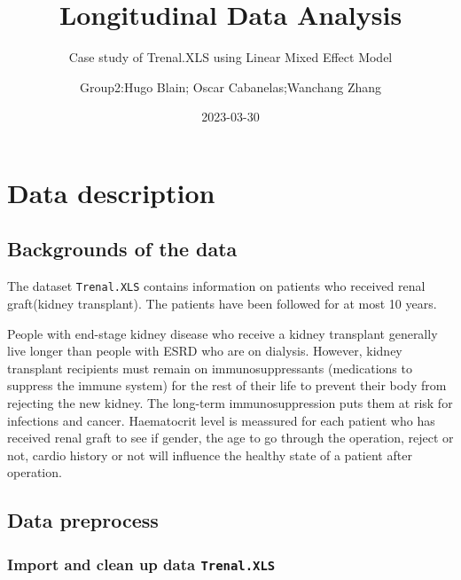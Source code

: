 \documentclass[
]{article}
\title{Longitudinal Data Analysis}
\subtitle{Case study of Trenal.XLS using Linear Mixed Effect Model}
\author{Group2:Hugo Blain; Oscar Cabanelas;Wanchang Zhang}
\date{2023-03-30}
\begin{document}
\maketitle

\newpage 
\tableofcontents 
\listoffigures
\listoftables
\newpage

\hypertarget{data-description}{%
\section{Data description}\label{data-description}}

\hypertarget{backgrounds-of-the-data}{%
\subsection{Backgrounds of the data}\label{backgrounds-of-the-data}}

The dataset \texttt{Trenal.XLS} contains information on patients who
received renal graft(kidney transplant). The patients have been followed
for at most 10 years.

People with end-stage kidney disease who receive a kidney transplant
generally live longer than people with ESRD who are on dialysis.
However, kidney transplant recipients must remain on immunosuppressants
(medications to suppress the immune system) for the rest of their life
to prevent their body from rejecting the new kidney. The long-term
immunosuppression puts them at risk for infections and cancer.
Haematocrit level is meassured for each patient who has received renal
graft to see if gender, the age to go through the operation, reject or
not, cardio history or not will influence the healthy state of a patient
after operation.

\hypertarget{data-preprocess}{%
\subsection{Data preprocess}\label{data-preprocess}}

\hypertarget{import-and-clean-up-data-trenal.xls}{%
\subsubsection{\texorpdfstring{Import and clean up data
\texttt{Trenal.XLS}}{Import and clean up data Trenal.XLS}}\label{import-and-clean-up-data-trenal.xls}}
\end{document}
